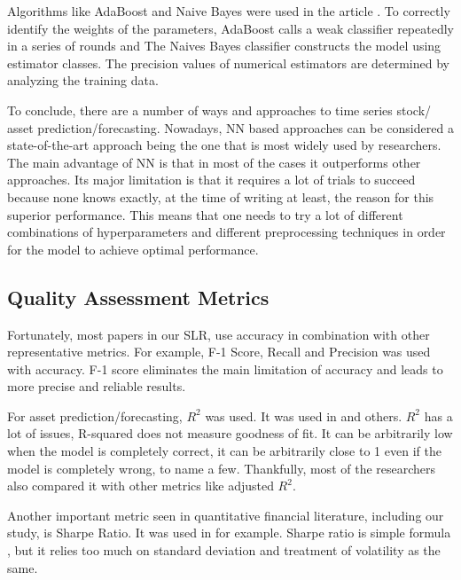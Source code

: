\documentclass[11pt]{article}
\begin{document}
Algorithms like AdaBoost and Naive Bayes were used in the article \cite{Haider2011}. To correctly identify the weights of the parameters, AdaBoost calls a weak classifier repeatedly in a series of rounds and The Naives Bayes classifier constructs the model using estimator classes. The precision values of numerical estimators are determined by analyzing the training data.

To conclude, there are a number of ways and approaches to time series stock/ asset prediction/forecasting. Nowadays, NN based approaches can be considered a state-of-the-art approach being the one that is most widely used by researchers. The main advantage of NN is that in most of the cases it outperforms other approaches. Its major limitation is that it requires a lot of trials to succeed because none knows exactly, at the time of writing at least, the reason for this superior performance. This means that one needs to try a lot of different combinations of hyperparameters and different preprocessing techniques in order for the model to achieve optimal performance.


\subsection{Quality Assessment Metrics}

 Fortunately, most papers in our SLR, use accuracy in combination with other representative metrics. For example, F-1 Score, Recall and Precision was used with accuracy. F-1 score eliminates the main limitation of accuracy and leads to more precise and reliable results.

 For asset prediction/forecasting, $R^2$ was used. It was used in \cite{Zhang2022, Chen2019, Uddin2020,son2022, Wu2019, Li2020, huang2021} and others. $R^2$ has a lot of issues, R-squared does not measure goodness of fit. It can be arbitrarily low when the model is completely correct, it can be arbitrarily close to 1 even if the model is completely wrong, to name a few. Thankfully, most of the researchers also compared it with other metrics like adjusted $R^2$. 

Another important metric seen in quantitative financial literature, including our study, is Sharpe Ratio. It was used in \cite{son2022} for example. Sharpe ratio is simple formula , but it relies too much on standard deviation and treatment of volatility as the same.
\end{document}
